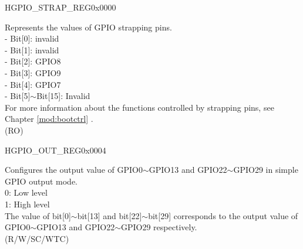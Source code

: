 \begin{register}{H}{GPIO\_STRAP\_REG}{0x0000}\label{regdesc:GPIOSTRAPREG}
%
%
\regnewline%
\begin{regdesc}\begin{reglist}
\label{fielddesc:GPIOSTRAPPING}\item [GPIO\_STRAPPING] Represents the values of GPIO strapping pins. \\
    - Bit[0]: invalid \\
    - Bit[1]: invalid \\
    - Bit[2]: GPIO8 \\
    - Bit[3]: GPIO9 \\
    - Bit[4]: GPIO7 \\
    - Bit[5]$\sim$Bit[15]: Invalid \\
For more information about the functions controlled by strapping pins, see Chapter \ref{mod:bootctrl} \textit{}.\\
 (RO)
\end{reglist}\end{regdesc}
\end{register}


\begin{register}{H}{GPIO\_OUT\_REG}{0x0004}\label{regdesc:GPIOOUTREG}
%
\regnewline%
\begin{regdesc}\begin{reglist}
\label{fielddesc:GPIOOUTDATAORIG}\item [GPIO\_OUT\_DATA\_ORIG] Configures the output value of GPIO0$\sim$GPIO13 and GPIO22$\sim$GPIO29 in simple GPIO output mode.\\
0: Low level\\
1: High level\\ 
The value of bit[0]$\sim$bit[13] and bit[22]$\sim$bit[29] corresponds to the output value of GPIO0$\sim$GPIO13 and GPIO22$\sim$GPIO29 respectively.\\
(R/W/SC/WTC)
\end{reglist}\end{regdesc}
\end{register}


